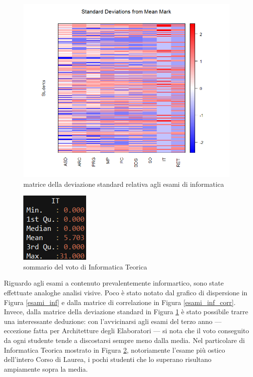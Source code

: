                 \begin{figure}
                    \centering
                    \caption{matrice della deviazione standard relativa agli esami di informatica}
                    \label{esami_inf_stddev}
                	\includegraphics[scale=0.32]{img/std_dev_matrix_2.png}
                \end{figure}

                \begin{figure}
                    \centering
                    \caption{sommario del voto di Informatica Teorica}
                    \label{it}
                	\includegraphics[scale=0.8]{img/it.png}
                \end{figure}

                Riguardo agli esami a contenuto prevalentemente informartico, sono state effettuate analoghe analisi visive. Poco è stato notato dal grafico di dispersione in Figura \ref{esami_inf} e dalla matrice di correlazione in Figura \ref{esami_inf_corr}. Invece, dalla matrice della deviazione standard in Figura \ref{esami_inf_stddev} è stato possibile trarre una interessante deduzione: con l’avvicinarsi agli esami del terzo anno –-- eccezione fatta per Architetture degli Elaboratori –-- si nota che il voto conseguito da ogni studente tende a discostarsi sempre meno dalla media. Nel particolare di Informatica Teorica mostrato in Figura \ref{it}, notoriamente l'esame più ostico dell'intero Corso di Laurea, i pochi studenti che lo superano risultano ampiamente sopra la media. \\

